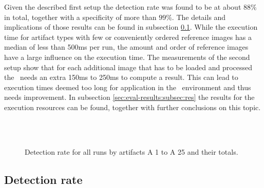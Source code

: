 Given the described first setup the detection rate was found to be at about $88\%$ in total, together with a specificity of more than $99\%$. The details and implications of those results can be found in subsection \ref{sec:eval-results:subsec:dect}. While the execution time for artifact types with few or conveniently ordered reference images has a median of less than 500ms per run, the amount and order of reference images have a large influence on the execution time. The measurements of the second setup show that for each additional image that has to be loaded and processed the \vd~needs an extra 150ms to 250ms to compute a result. This can lead to execution times deemed too long for application in the \ape~environment and thus needs improvement. In subsection \ref{sec:eval-results:subsec:res} the results for the execution resources can be found, together with further conclusions on this topic.

\begin{figure}[h!]
	\hfill\\
	\hfill\\
	\caption{Detection rate for all runs by artifacts A 1 to A 25 and their totals.}\label{fig:result-quality-sum}
\end{figure}

\subsection{Detection rate}\label{sec:eval-results:subsec:dect}


